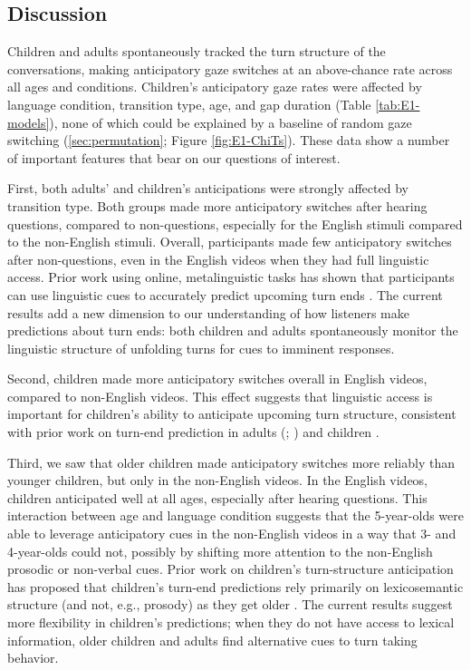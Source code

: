 \documentclass[authoryear, 12pt]{elsarticle}
\begin{document}
\subsection*{Discussion}
\label{sec:discussion1}

Children and adults spontaneously tracked the turn structure of the conversations, making anticipatory gaze switches at an above-chance rate across all ages and conditions. Children's anticipatory gaze rates were affected by language condition, transition type, age, and gap duration (Table \ref{tab:E1-models}), none of which could be explained by a baseline of random gaze switching (\ref{sec:permutation}; Figure \ref{fig:E1-ChiTs}). These data show a number of important features that bear on our questions of interest. 

First, both adults' and children's anticipations were strongly affected by transition type. Both groups made more anticipatory switches after hearing questions, compared to non-questions, especially for the English stimuli compared to the non-English stimuli. Overall, participants made few anticipatory switches after non-questions, even in the English videos when they had full linguistic access. Prior work using online, metalinguistic tasks has shown that participants can use linguistic cues to accurately predict upcoming turn ends \citep{torreira2015, magyari2012, de-ruiter2006}. The current results add a new dimension to our understanding of how listeners make predictions about turn ends: both children and adults spontaneously monitor the linguistic structure of unfolding turns for cues to imminent responses.

Second, children made more anticipatory switches overall in English videos, compared to non-English videos. This effect suggests that linguistic access is important for children's ability to anticipate upcoming turn structure, consistent with prior work on turn-end prediction in adults (\citealp{de-ruiter2006}; \citealp{magyari2012}) and children \citep{keitel2013}.

Third, we saw that older children made anticipatory switches more reliably than younger children, but only in the non-English videos. In the English videos, children anticipated well at all ages, especially after hearing questions. This interaction between age and language condition suggests that the 5-year-olds were able to leverage anticipatory cues in the non-English videos in a way that 3- and 4-year-olds could not, possibly by shifting more attention to the non-English prosodic or non-verbal cues. Prior work on children's turn-structure anticipation has proposed that children's turn-end predictions rely primarily on lexicosemantic structure (and not, e.g., prosody) as they get older \citep{keitel2013}. The current results suggest more flexibility in children's predictions; when they do not have access to lexical information, older children and adults find alternative cues to turn taking behavior.
\end{document}
